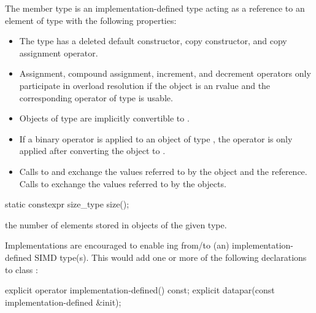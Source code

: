 \pnum The member type  is an implementation-defined type acting as a reference to an element of type  with the following properties:
\label{sec:reference type}
\begin{itemize}
  \item The type has a deleted default constructor, copy constructor, and copy assignment operator.

  \item Assignment, compound assignment, increment, and decrement operators only participate in overload resolution if the  object is an rvalue and the corresponding operator of type  is usable.

  \item Objects of type  are implicitly convertible to .

  \item If a binary operator is applied to an object of type , the operator is only applied after converting the  object to .

  \item Calls to  and  exchange the values referred to by the  object and the  reference.
  Calls to  exchange the values referred to by the  objects.
\end{itemize}

\begin{itemdecl}
static constexpr size_type size();
\end{itemdecl}
\begin{itemdescr}
  \pnum\returns the number of elements stored in objects of the given \datapar[<T, Abi>] type.
\end{itemdescr}

\pnum\begin{noteEnv} Implementations are encouraged to enable ing from/to (an) implementation-defined SIMD type(s).
This would add one or more of the following declarations to class \datapar:
\begin{itemdecl}
explicit operator implementation-defined() const;
explicit datapar(const implementation-defined &init);
\end{itemdecl}
\end{noteEnv}

